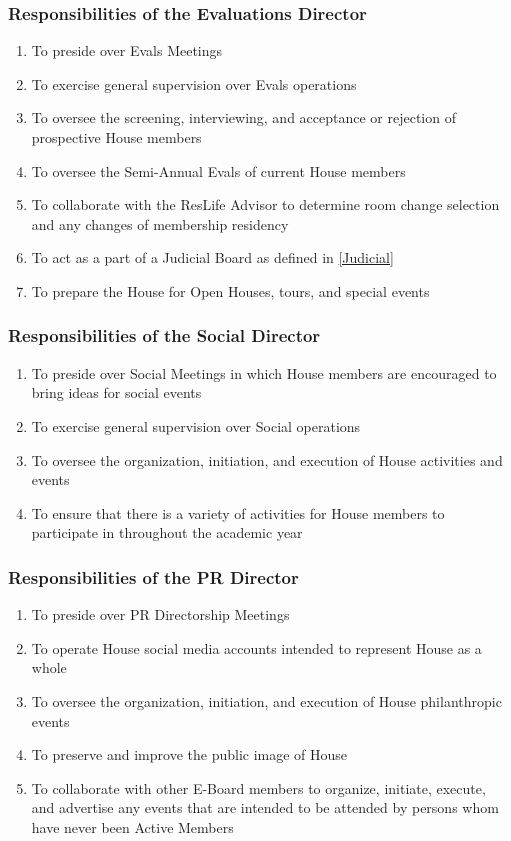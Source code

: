 \documentclass{article}
\newcommand{\asubsection}[1]{\subsubsection{#1} \label{#1}}
\begin{document}
\asubsection{Responsibilities of the Evaluations Director}
\begin{enumerate}
	\item To preside over Evals Meetings
	\item To exercise general supervision over Evals operations
	\item To oversee the screening, interviewing, and acceptance or rejection of prospective House members
	\item To oversee the Semi-Annual Evals of current House members
	\item To collaborate with the ResLife Advisor to determine room change selection and any changes of membership residency
	\item To act as a part of a Judicial Board as defined in \ref{Judicial}
	\item To prepare the House for Open Houses, tours, and special events
\end{enumerate}

\asubsection{Responsibilities of the Social Director}
\begin{enumerate}
	\item To preside over Social Meetings in which House members are encouraged to bring ideas for social events
	\item To exercise general supervision over Social operations
	\item To oversee the organization, initiation, and execution of House activities and events
	\item To ensure that there is a variety of activities for House members to participate in throughout the academic year
\end{enumerate}

\asubsection{Responsibilities of the PR Director}
\begin{enumerate}
	\item To preside over PR Directorship Meetings
	\item To operate House social media accounts intended to represent House as a whole
	\item To oversee the organization, initiation, and execution of House philanthropic events
	\item To preserve and improve the public image of House
	\item To collaborate with other E-Board members to organize, initiate, execute, and advertise any events that are intended to be attended by persons whom have never been Active Members
\end{enumerate}
\end{document}
